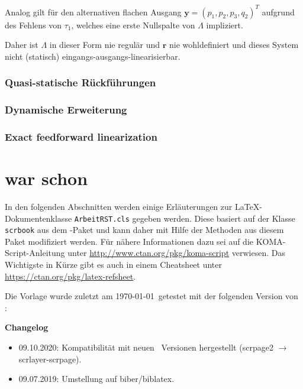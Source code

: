 Analog gilt für den alternativen flachen Ausgang $\pmb{y} = (p_1, p_2, p_3, q_2)^T$ aufgrund des Fehlens von $\tau_1$, welches eine erste Nullspalte von $\Lambda$ impliziert.

Daher ist $\Lambda$ in dieser Form nie regulär und $\pmb{r}$ nie wohldefiniert und dieses System nicht (statisch) eingangs-ausgangs-linearisierbar. 

\subsection{Quasi-statische Rückführungen}

\subsection{Dynamische Erweiterung}

\subsection{Exact feedforward linearization}

\chapter{war schon}
In den folgenden Abschnitten werden einige Erläuterungen zur \LaTeX-Dokumentenklasse \texttt{ArbeitRST.cls} gegeben werden. Diese basiert auf der Klasse \texttt{scrbook} aus dem \KOMAScript-Paket und kann daher mit Hilfe der Methoden aus diesem Paket modifiziert werden. Für nähere Informationen dazu sei auf die KOMA-Script-Anleitung unter \url{http://www.ctan.org/pkg/koma-script} verwiesen. Das Wichtigste in Kürze gibt es auch in einem Cheatsheet unter \url{https://ctan.org/pkg/latex-refsheet}.

Die Vorlage wurde zuletzt am \today~getestet mit der folgenden Version von \KOMAScript: \KOMAScriptVersion 

\textbf{Changelog}
\begin{itemize}
	\item 09.10.2020: Kompatibilität mit neuen \KOMAScript~Versionen hergestellt (scrpage2 $\rightarrow$ scrlayer-scrpage).
	\item 09.07.2019: Umstellung auf biber/biblatex.
\end{itemize}

